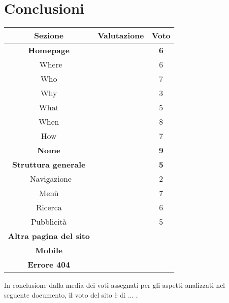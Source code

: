 \section{Conclusioni}
\begin{center}
	\begin{tabularx}{\textwidth}{|c|X|c|}
		\hline
		\textbf{Sezione} & \textbf{Valutazione} &\textbf{Voto} \\ \hline
		
		\textbf{Homepage} &	&	\textbf{6}\\
		\hdashline 
		\multirow{5}{0cm}\
		Where 	& \textit{} &	6\\
		Who		& \textit{} &	7\\
		Why 	& \textit{} &	3\\
		What 	& \textit{} &	5\\
		When 	& \textit{} &	8\\
		How 	& \textit{} &	7\\
		\hline
		
		\textbf{Nome} & \textit{\textbf{}} & \textbf{9} \\ \hline
		
		\textbf{Struttura generale} &	&	\textbf{5}\\
		\hdashline 
		\multirow{5}{0cm}\
		Navigazione & \textit{} &	2\\
		Menù		& \textit{} &	7\\
		Ricerca 	& \textit{} &	6\\
		Pubblicità 	& \textit{} &	5\\
		\hline
		 
		\textbf{Altra pagina del sito} 	& \textit{\textbf{}} & \textbf{} \\ \hline
		\textbf{Mobile} 				& \textit{\textbf{}} & \textbf{} \\ \hline
		\textbf{Errore 404} 			& \textit{\textbf{}} & \textbf{} \\ \hline
		
	\end{tabularx}

\end{center}

In conclusione dalla media dei voti assegnati per gli aspetti analizzati nel seguente documento, il voto del sito è di ... .